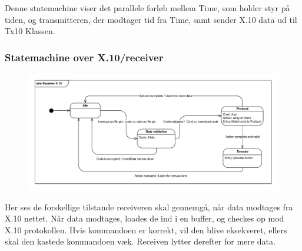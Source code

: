 \begin{landscape}
Denne statemachine viser det parallele forløb mellem Time, som holder styr på tiden, og transmitteren, der modtager tid fra Time, samt sender X.10 data ud til Tx10 Klassen.

\clearpage

\subsubsection{Statemachine over X.10/receiver}

\begin{figure}[h]
\centering
\includegraphics[width=\textheight + 190pt,clip=true, trim=18 15 15 12]{Systemarkitektur/diagrammer/Stm_receiver_X10}
\end{figure}

Her ses de forskellige tilstande receiveren skal gennemgå, når data modtages fra X.10 nettet. Når data modtages, loades de ind i en buffer, og checkes op mod X.10 protokollen. Hvis kommandoen er korrekt, vil den blive eksekveret, ellers skal den kastede kommandoen væk. Receiven lytter derefter for mere data. 



\end{landscape}

\clearpage